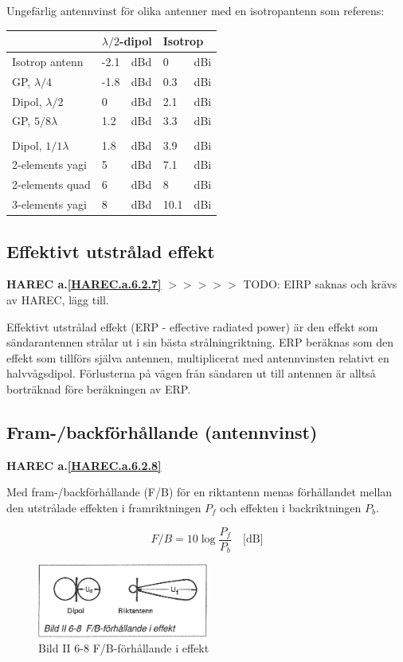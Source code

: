 Ungefärlig antennvinst för olika antenner med en isotropantenn som referens:
\begin{tabular}{l|ll|ll}
  & \multicolumn{2}{l|}{\(\lambda/2\)-dipol} &
  \multicolumn{2}{l}{Isotrop} \\
  \hline
  Isotrop antenn       & -2.1 & dBd & 0   & dBi \\
  GP, \(\lambda/4\)    & -1.8 & dBd & 0.3 & dBi \\
  Dipol, \(\lambda/2\) & 0    & dBd & 2.1 & dBi \\
  GP, \(5/8\lambda\)   & 1.2  & dBd & 3.3 & dBi \\
  & & & & \\
  Dipol, \(1/1\lambda\) & 1.8 & dBd & 3.9  & dBi \\
  2-elements yagi       & 5   & dBd & 7.1  & dBi \\
  2-elements quad       & 6   & dBd & 8    & dBi \\
  3-elements yagi       & 8   & dBd & 10.1 & dBi \\
\end{tabular}


\subsection{Effektivt utstrålad effekt}
\textbf{
HAREC a.\ref{HAREC.a.6.2.7}\label{myHAREC.a.6.2.7}
}
$>>>>>$ TODO: EIRP saknas och krävs av HAREC, lägg till.

Effektivt utstrålad effekt (ERP - effective radiated power) är den
effekt som sändarantennen strålar ut i sin bästa
strålningriktning. ERP beräknas som den effekt som tillförs själva
antennen, multiplicerat med antennvinsten relativt en
halvvågsdipol. Förlusterna på vägen från sändaren ut till antennen är
alltså borträknad före beräkningen av ERP.

\subsection{Fram-/backförhållande (antennvinst)}
\textbf{
HAREC a.\ref{HAREC.a.6.2.8}\label{myHAREC.a.6.2.8}
}

Med fram-/backförhållande (F/B) för en riktantenn menas förhållandet
mellan den utstrålade effekten i framriktningen \(P_f\) och effekten i
backriktningen \(P_b\).

\[ F/B = 10 \log\frac{P_f}{P_b} \quad \text{[dB]} \]

\begin{figure}
  \includegraphics[width=0.5\textwidth]{images/bild_2_6-08}
  \caption{Bild II 6-8 F/B-förhållande i effekt}
  \label{fig:bildII6-8}
\end{figure}

